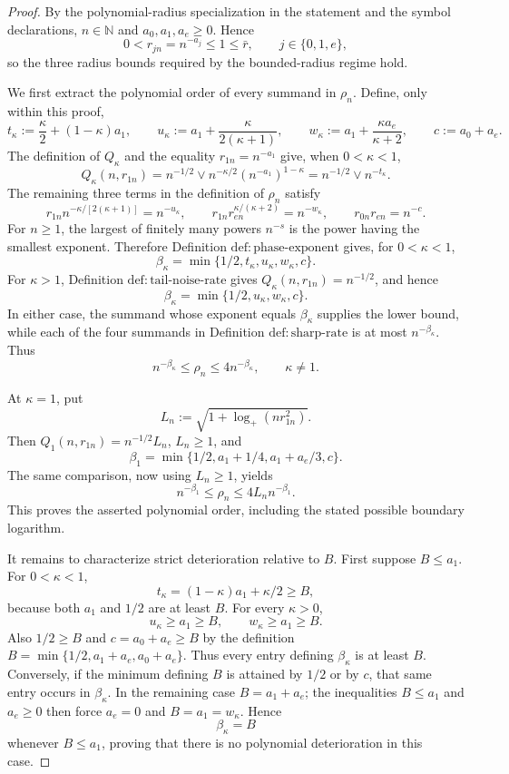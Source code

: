 \documentclass{article}
\begin{document}
\begin{proof}
By the polynomial-radius specialization in the statement and the symbol declarations, \(n\in\mathbb N\) and \(a_0,a_1,a_e\geq 0\).  Hence
\[
0<r_{jn}=n^{-a_j}\leq 1\leq \bar r,
\qquad j\in\{0,1,e\},
\]
so the three radius bounds required by the bounded-radius regime hold.

We first extract the polynomial order of every summand in \(\rho_n\).  Define, only within this proof,
\[
t_\kappa:=\frac{\kappa}{2}+(1-\kappa)a_1,
\qquad
u_\kappa:=a_1+\frac{\kappa}{2(\kappa+1)},
\qquad
w_\kappa:=a_1+\frac{\kappa a_e}{\kappa+2},
\qquad
c:=a_0+a_e.
\]
The definition of \(Q_\kappa\) and the equality \(r_{1n}=n^{-a_1}\) give, when \(0<\kappa<1\),
\[
Q_\kappa(n,r_{1n})
=n^{-1/2}\vee n^{-\kappa/2}(n^{-a_1})^{1-\kappa}
=n^{-1/2}\vee n^{-t_\kappa}.
\]
The remaining three terms in the definition of \(\rho_n\) satisfy
\[
r_{1n}n^{-\kappa/[2(\kappa+1)]}=n^{-u_\kappa},
\qquad
r_{1n}r_{en}^{\kappa/(\kappa+2)}=n^{-w_\kappa},
\qquad
r_{0n}r_{en}=n^{-c}.
\]
For \(n\geq1\), the largest of finitely many powers \(n^{-s}\) is the power having the smallest exponent.  Therefore Definition \(\mathrm{def{:}phase\mbox{-}exponent}\) gives, for \(0<\kappa<1\),
\[
\beta_\kappa=\min\{1/2,t_\kappa,u_\kappa,w_\kappa,c\}.
\]
For \(\kappa>1\), Definition \(\mathrm{def{:}tail\mbox{-}noise\mbox{-}rate}\) gives \(Q_\kappa(n,r_{1n})=n^{-1/2}\), and hence
\[
\beta_\kappa=\min\{1/2,u_\kappa,w_\kappa,c\}.
\]
In either case, the summand whose exponent equals \(\beta_\kappa\) supplies the lower bound, while each of the four summands in Definition \(\mathrm{def{:}sharp\mbox{-}rate}\) is at most \(n^{-\beta_\kappa}\).  Thus
\[
n^{-\beta_\kappa}\leq \rho_n\leq 4n^{-\beta_\kappa},
\qquad \kappa\neq1.
\]

At \(\kappa=1\), put
\[
L_n:=\sqrt{1+\log_+(nr_{1n}^2)}.
\]
Then \(Q_1(n,r_{1n})=n^{-1/2}L_n\), \(L_n\geq1\), and
\[
\beta_1=\min\{1/2,a_1+1/4,a_1+a_e/3,c\}.
\]
The same comparison, now using \(L_n\geq1\), yields
\[
n^{-\beta_1}\leq \rho_n\leq4L_n n^{-\beta_1}.
\]
This proves the asserted polynomial order, including the stated possible boundary logarithm.

It remains to characterize strict deterioration relative to \(B\).  First suppose \(B\leq a_1\).  For \(0<\kappa<1\),
\[
t_\kappa=(1-\kappa)a_1+\kappa/2\geq B,
\]
because both \(a_1\) and \(1/2\) are at least \(B\).  For every \(\kappa>0\),
\[
u_\kappa\geq a_1\geq B,
\qquad
w_\kappa\geq a_1\geq B.
\]
Also \(1/2\geq B\) and \(c=a_0+a_e\geq B\) by the definition
\(B=\min\{1/2,a_1+a_e,a_0+a_e\}\).  Thus every entry defining \(\beta_\kappa\) is at least \(B\).  Conversely, if the minimum defining \(B\) is attained by \(1/2\) or by \(c\), that same entry occurs in \(\beta_\kappa\).  In the remaining case \(B=a_1+a_e\); the inequalities \(B\leq a_1\) and \(a_e\geq0\) then force \(a_e=0\) and \(B=a_1=w_\kappa\).  Hence
\[
\beta_\kappa=B
\]
whenever \(B\leq a_1\), proving that there is no polynomial deterioration in this case.


\end{proof}
\end{document}
